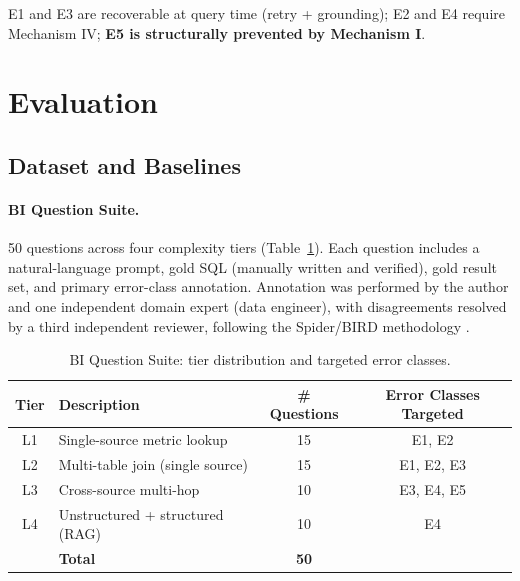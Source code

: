 \documentclass[11pt,a4paper]{article}
\begin{document}
E1 and E3 are recoverable at query time (retry + grounding); E2 and E4 require
Mechanism IV; \textbf{E5 is structurally prevented by Mechanism I}.

\section{Evaluation}\label{sec:eval}

\subsection{Dataset and Baselines}\label{sec:dataset}

\paragraph{BI Question Suite.}
50 questions across four complexity tiers (Table~\ref{tab:dataset}).  Each question
includes a natural-language prompt, gold SQL (manually written and verified),
gold result set, and primary error-class annotation.  Annotation was performed by
the author and one independent domain expert (data engineer), with disagreements
resolved by a third independent reviewer, following the Spider/BIRD methodology
\citep{yu2018spider,li2023bird}.

\begin{table}[htbp]
\centering
\caption{BI Question Suite: tier distribution and targeted error classes.}
\label{tab:dataset}
\small
\begin{tabular}{clcc}
\toprule
\textbf{Tier} & \textbf{Description} & \textbf{\# Questions} & \textbf{Error Classes Targeted} \\
\midrule
L1 & Single-source metric lookup         & 15 & E1, E2 \\
L2 & Multi-table join (single source)    & 15 & E1, E2, E3 \\
L3 & Cross-source multi-hop              & 10 & E3, E4, E5 \\
L4 & Unstructured + structured (RAG)     & 10 & E4 \\
\midrule
   & \textbf{Total}                      & \textbf{50} & \\
\bottomrule
\end{tabular}
\end{table}
\end{document}

